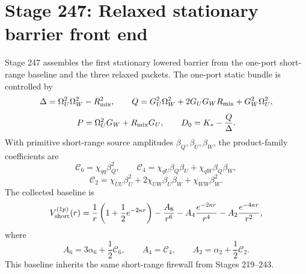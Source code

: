 \section{Stage 247: Relaxed stationary barrier front end}
\label{sec:app-part08:relaxed-stationary-barrier-front-end}
\label{stage:247}


Stage 247 assembles the first stationary lowered barrier from the one-port short-range baseline and the three relaxed packets.  The one-port static bundle is controlled by
\begin{equation}
\label{eq:app-part08-stage247-delta-q-p}
\Delta=\Omega_U^2\Omega_W^2-R_{\rm mix}^{2},
\qquad
Q=G_U^2\Omega_W^2+2G_UG_WR_{\rm mix}+G_W^2\Omega_U^2,
\end{equation}
\begin{equation}
\label{eq:app-part08-stage247-p-d0}
P=\Omega_U^2G_W+R_{\rm mix}G_U,
\qquad
D_0=K_*-\frac{Q}{\Delta}.
\end{equation}
With primitive short-range source amplitudes \(\beta_Q,\beta_U,\beta_W\), the product-family coefficients are
\begin{equation}
\label{eq:app-part08-stage247-c6c4c2}
\mathcal C_6=\chi_{qq}\beta_Q^2,
\qquad
\mathcal C_4=\chi_{qU}\beta_Q\beta_U+\chi_{qW}\beta_Q\beta_W,
\end{equation}
\begin{equation}
\label{eq:app-part08-stage247-c2}
\mathcal C_2=\chi_{UU}\beta_U^2+2\chi_{UW}\beta_U\beta_W+\chi_{WW}\beta_W^2.
\end{equation}
The collected baseline is
\begin{equation}
\label{eq:app-part08-stage247-vshort}
V_{\rm short}^{(1p)}(r)
=
\frac1r\left(1+\frac12e^{-2\kappa r}\right)
-
\frac{A_6}{r^6}
-
A_4\frac{e^{-2\kappa r}}{r^4}
-
A_2\frac{e^{-4\kappa r}}{r^2},
\end{equation}
where
\begin{equation}
\label{eq:app-part08-stage247-a6a4a2}
A_6=3\alpha_6+\frac12\mathcal C_6,
\qquad
A_4=\mathcal C_4,
\qquad
A_2=\alpha_2+\frac12\mathcal C_2.
\end{equation}
This baseline inherits the same short-range firewall from Stages 219--243.

